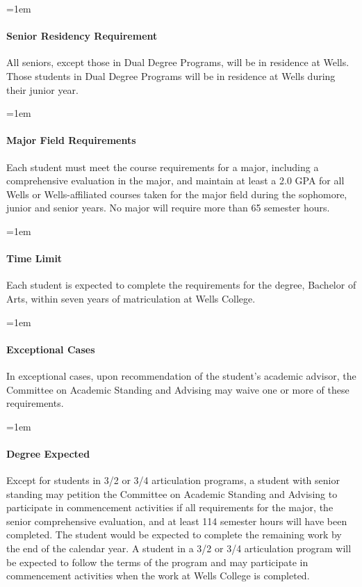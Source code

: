 \documentclass{manual}
\newcommand{\modified}[1]{}
\newcommand{\oldbreak}[1]{}
\let\oldparagraph\paragraph
\renewcommand\paragraph{\leftskip=1em\oldparagraph}
\begin{document}
\paragraph{Senior Residency Requirement}

All seniors, except those in Dual Degree Programs, will be in residence at Wells. Those students in Dual Degree Programs will be in residence at Wells during their junior year.

\oldbreak{IV-I}

\paragraph{Major Field Requirements}

Each \modified{5/13/93}  student must meet the course requirements for a major, including a comprehensive evaluation in the major, and maintain at least a 2.0 GPA for all Wells or Wells-affiliated courses taken for the major field during the sophomore, junior and senior years. No major will require more than 65 semester hours.

\paragraph{Time Limit}

Each student is expected to complete the requirements for the degree, Bachelor of Arts, within seven years of matriculation at Wells College. 

\paragraph{Exceptional Cases}

In exceptional cases, upon recommendation of the student's academic advisor, the Committee on Academic Standing and Advising may waive one or more of these requirements.

\paragraph{Degree Expected}

 Except\modified{9/9/97}  for students in 3/2 or 3/4 articulation programs, a student with senior standing may petition the Committee on Academic Standing and Advising to participate in commencement activities if all requirements for the major, the senior comprehensive evaluation, and at least 114 semester hours will have been completed. The student would be expected to complete the remaining work by the end of the calendar year. A student in a 3/2 or 3/4 articulation program will be expected to follow the terms of the program and may participate in commencement activities when the work at Wells College is completed.
\end{document}
